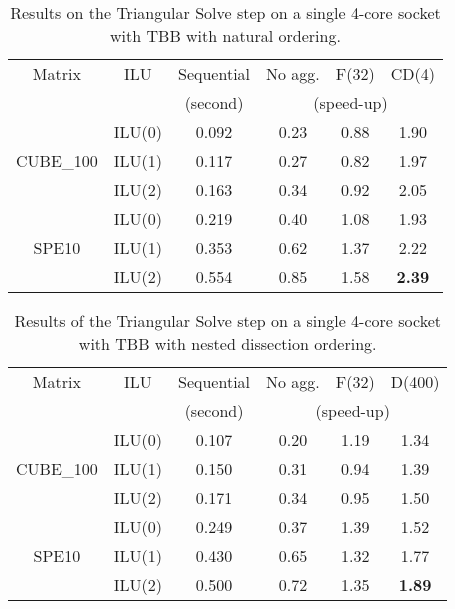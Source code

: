\begin{table}[!h]
  \renewcommand{\arraystretch}{1.3}
  \caption{Results on the Triangular Solve step on a single 4-core
    socket with TBB with natural ordering.}
  \label{tab:tbb:4:solve:no}
  \centering
  \begin{tabular}{|c|c||c|c|c|c|}
    \hline
    Matrix & ILU & Sequential & No agg. & F(32) & CD(4)\\
    &     &  (second)  & \multicolumn{3}{c|}{(speed-up)}\\
    \hline
    \hline
    & ILU(0) & 0.092 & 0.23 & 0.88 & 1.90\\
    CUBE\_100 & ILU(1) & 0.117 & 0.27 & 0.82 & 1.97\\
    & ILU(2) & 0.163 & 0.34 & 0.92 & 2.05\\
    \hline
    & ILU(0) & 0.219 & 0.40 & 1.08 & 1.93\\
    SPE10     & ILU(1) & 0.353 & 0.62 & 1.37 & 2.22\\
    & ILU(2) & 0.554 & 0.85 & 1.58 & {\bf 2.39}\\
    \hline
  \end{tabular}
\end{table}

\begin{table}[!h]
  \renewcommand{\arraystretch}{1.3}
  \caption{Results of the Triangular Solve step on a single 4-core
    socket with TBB with nested dissection ordering.}
  \label{tab:tbb:4:solve:nested}
  \centering
  \begin{tabular}{|c|c||c|c|c|c|}
    \hline
    Matrix & ILU & Sequential & No agg. & F(32) & D(400)\\
    &     &  (second)  & \multicolumn{3}{c|}{(speed-up)}\\
    \hline
    \hline
    & ILU(0) & 0.107 & 0.20 & 1.19 & 1.34\\
    CUBE\_100 & ILU(1) & 0.150 & 0.31 & 0.94 & 1.39\\
    & ILU(2) & 0.171 & 0.34 & 0.95 & 1.50\\
    \hline
    & ILU(0) & 0.249 & 0.37 & 1.39 & 1.52\\
    SPE10     & ILU(1) & 0.430 & 0.65 & 1.32 & 1.77\\
    & ILU(2) & 0.500 & 0.72 & 1.35 & {\bf 1.89}\\
    \hline
  \end{tabular}
\end{table}

